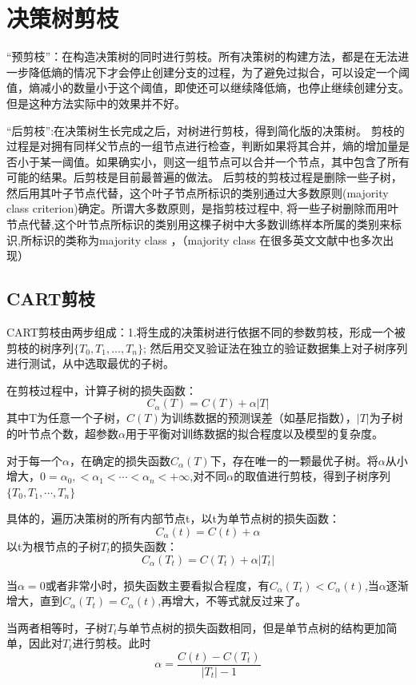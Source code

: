 \documentclass[UTF8]{ctexart} %
\begin{document}
	\section{决策树剪枝}
		“预剪枝”：在构造决策树的同时进行剪枝。所有决策树的构建方法，都是在无法进一步降低熵的情况下才会停止创建分支的过程，为了避免过拟合，可以设定一个阈值，熵减小的数量小于这个阈值，即使还可以继续降低熵，也停止继续创建分支。但是这种方法实际中的效果并不好。
		
		“后剪枝”:在决策树生长完成之后，对树进行剪枝，得到简化版的决策树。
		剪枝的过程是对拥有同样父节点的一组节点进行检查，判断如果将其合并，熵的增加量是否小于某一阈值。如果确实小，则这一组节点可以合并一个节点，其中包含了所有可能的结果。后剪枝是目前最普遍的做法。
		后剪枝的剪枝过程是删除一些子树，然后用其叶子节点代替，这个叶子节点所标识的类别通过大多数原则(majority class criterion)确定。所谓大多数原则，是指剪枝过程中, 将一些子树删除而用叶节点代替,这个叶节点所标识的类别用这棵子树中大多数训练样本所属的类别来标识,所标识的类称为majority class ，（majority class 在很多英文文献中也多次出现）
		
		\subsection{CART剪枝}
			CART剪枝由两步组成：1.将生成的决策树进行依据不同的参数剪枝，形成一个被剪枝的树序列$\{T_0,T_1,\dots,T_n\}$;
			然后用交叉验证法在独立的验证数据集上对子树序列进行测试，从中选取最优的子树。
			
			在剪枝过程中，计算子树的损失函数：
			\[C_\alpha(T)=C(T)+\alpha|T|\]
			其中T为任意一个子树，$C(T)$为训练数据的预测误差（如基尼指数），$|T|$为子树的叶节点个数，超参数$\alpha$用于平衡对训练数据的拟合程度以及模型的复杂度。
			
			对于每一个$\alpha$，在确定的损失函数$C_\alpha(T)$下，存在唯一的一颗最优子树。将$\alpha$从小增大，$0=\alpha_0,<\alpha_1<\cdots<\alpha_n<+\infty$,对不同$\alpha$的取值进行剪枝，得到子树序列$\{T_0,T_1,\cdots,T_n\}$
			
			具体的，遍历决策树的所有内部节点t，以t为单节点树的损失函数：
			\[C_\alpha(t)=C(t)+\alpha\]
			以t为根节点的子树$T_t$的损失函数：
			\[C_\alpha(T_t)=C(T_t)+\alpha|T_t|\]
			
			当$\alpha=0$或者非常小时，损失函数主要看拟合程度，有$C_\alpha(T_t)<C_\alpha(t)$,当$\alpha$逐渐增大，直到$C_\alpha(T_t)=C_\alpha(t)$,再增大，不等式就反过来了。
			
			当两者相等时，子树$T_t$与单节点树的损失函数相同，但是单节点树的结构更加简单，因此对$T_t$进行剪枝。此时\[\alpha=\frac{C(t)-C(T_t)}{|T_t|-1}\]
			
\end{document}
